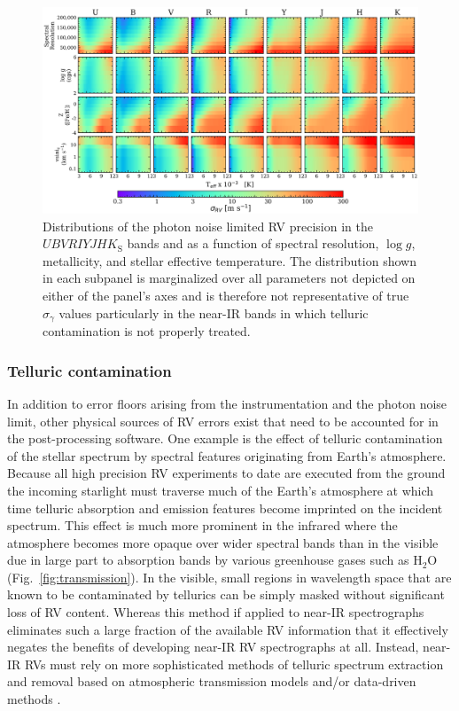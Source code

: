 \begin{figure}
  \centering
  \includegraphics[width=\textwidth]{figures/sigRV_grid.png}
  \caption[Doppler information content over spectral band passes and stellar properties.]
      {Distributions of the photon noise limited RV precision in the $UBVRIYJHK_{\text{S}}$
    bands and as a function of spectral resolution, $\log{g}$, metallicity, \vsini{,}
    and stellar effective temperature. The distribution shown in each subpanel is marginalized
    over all parameters not depicted on either of the panel's axes and is therefore not
    representative of true $\sigma_{\gamma}$ values particularly in the near-IR bands
    in which telluric contamination is not properly treated.}
  \label{fig:sigrv}
\end{figure}

\subsubsection{Telluric contamination} \label{sect:tellurics}
In addition to error floors arising from the instrumentation and the photon noise limit,
other physical sources of RV errors exist that need to be accounted for in the post-processing
software. One example is the effect
of telluric contamination of the stellar spectrum by spectral features originating from Earth's
atmosphere. Because all high precision RV experiments to date are executed from the ground
the incoming starlight must traverse much of the Earth's atmosphere at which time telluric
absorption and emission features become
imprinted on the incident spectrum. This effect is much more prominent in the infrared where
the atmosphere becomes more opaque over wider spectral bands than in the visible due
in large part to absorption bands by various greenhouse gases such as H$_2$O
(Fig.~\ref{fig:transmission}). In the visible, small regions
in wavelength space that are known to be contaminated by tellurics can be simply masked without
significant loss of RV content. Whereas this method if applied to near-IR spectrographs 
eliminates such a large fraction of the available RV information that it effectively negates the
benefits of developing near-IR RV spectrographs at all.
Instead, near-IR RVs must rely on more sophisticated methods of telluric spectrum extraction and
removal based on atmospheric transmission models \citep[e.g.][]{vacca03,bertaux14}
and/or data-driven methods \citep[e.g.][]{artigau14,bedell19}.

